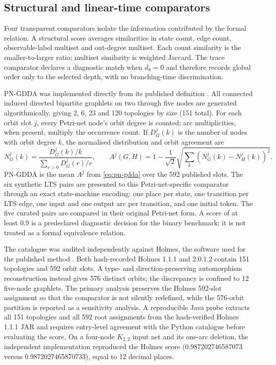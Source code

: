 \documentclass[JMCS,submit]{resources/ISRP}
\theoremstyle{definition}
\theoremstyle{remark}
\numberwithin{equation}{section}
\begin{document}
\subsection{Structural and linear-time comparators}\label{sec:baselines}

Four transparent comparators isolate the information contributed by the formal
relation. A structural score averages similarities in state count,
edge count, observable-label multiset and out-degree multiset. Each count
similarity is the smaller-to-larger ratio; multiset similarity is weighted
Jaccard. The trace comparator declares a diagnostic match when $d_8=0$ and
therefore records global order only to the selected depth, with no branching-time
discrimination.

PN-GDDA was implemented directly from its published definition
\cite{Szawulak2022}. All connected induced directed bipartite graphlets on two
through five nodes are generated algorithmically, giving 2, 6, 23 and 120
topologies by size (151 total). For each orbit slot $j$, every Petri-net node's
orbit degree is counted; arc multiplicities, when present, multiply the occurrence
count. If $D_G^j(k)$ is the number of nodes with orbit degree $k$, the normalised
distribution and orbit agreement are
\begin{equation}\label{eq:pn-gdda}
N_G^j(k)=\frac{D_G^j(k)/k}{\sum_{r>0}D_G^j(r)/r},\qquad
A^j(G,H)=1-\frac{1}{\sqrt{2}}
\sqrt{\sum_k\left(N_G^j(k)-N_H^j(k)\right)^2}.
\end{equation}
PN-GDDA is the mean $A^j$ from \eqref{eq:pn-gdda} over the 592 published slots.
The six synthetic LTS pairs are presented to this Petri-net-specific comparator
through an exact state-machine encoding: one place per state, one transition per
LTS edge, one input and one output arc per transition, and one initial token. The
five curated pairs are compared in their original Petri-net form. A score of at
least 0.9 is a predeclared diagnostic decision for the binary benchmark; it is not
treated as a formal equivalence relation.

The catalogue was audited independently against Holmes, the software used for
the published method \cite{Radom2017}. Both hash-recorded Holmes 1.1.1 and
2.0.1.2 contain 151 topologies and 592 orbit slots. A type- and
direction-preserving automorphism reconstruction instead gives 576 distinct
orbits; the discrepancy is confined to 12 five-node graphlets. The primary
analysis preserves the Holmes 592-slot assignment so that the comparator is not
silently redefined, while the 576-orbit partition is reported as a sensitivity
analysis. A reproducible Java probe extracts all 151 topologies and all 592 root
assignments from the hash-verified Holmes 1.1.1 JAR and requires entry-level
agreement with the Python catalogue before evaluating the score. On a four-node
$K_{2,2}$ input net and its one-arc deletion, the independent implementation
reproduced the Holmes score (0.987202746587073 versus 0.9872027465870733), equal
to 12 decimal places.
\end{document}
